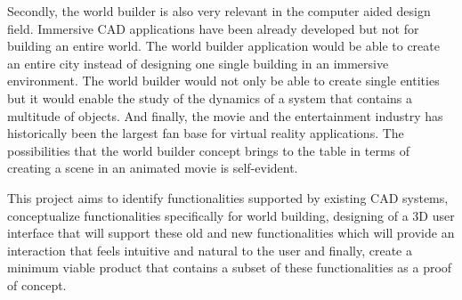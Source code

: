 Secondly, the world builder is also very relevant in the computer aided design field. Immersive CAD applications have been already developed but not for
building an entire world. The world builder application would be able to create an entire city instead of designing one single building in an immersive 
environment. The world builder would not only be able to create single entities but it would enable the study of the dynamics of a system that contains
a multitude of objects. And finally, the movie and the entertainment industry has historically been the largest fan base for virtual reality 
applications. The possibilities that the world builder concept brings to the table in terms of creating a scene in an animated movie is self-evident.


This project aims to identify functionalities supported by existing CAD systems, conceptualize functionalities specifically for world building, designing
of a 3D user interface that will support these old and new functionalities which will provide an interaction that feels intuitive and natural to the user
and finally, create a minimum viable product that contains a subset of these functionalities as a proof of concept.




























